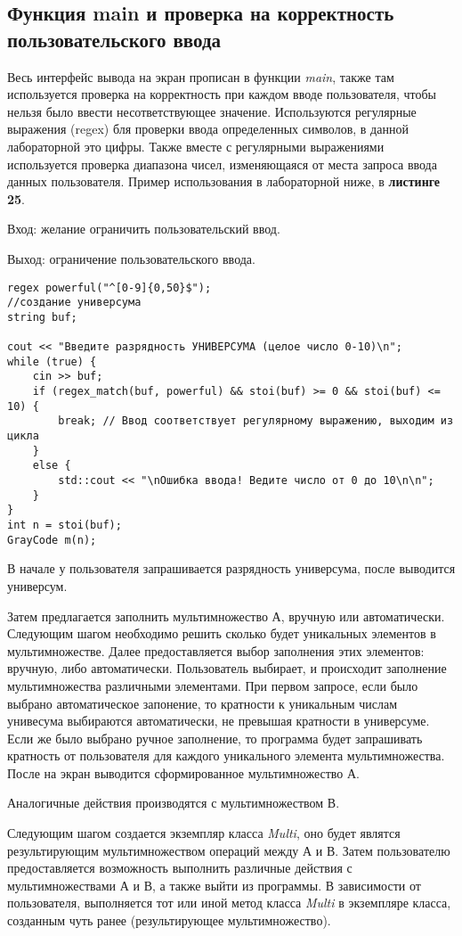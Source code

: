 \documentclass[10pt,a4paper,final]{article} %
\begin{document}
 
\newpage
\subsection{Функция main и проверка на корректность пользовательского ввода}
\par Весь интерфейс вывода на экран прописан в функции \textit{main}, также там используется проверка на корректность при каждом вводе пользователя, чтобы нельзя было ввести несответствующее значение. 
Используются регулярные выражения (regex) бля проверки ввода определенных символов, в данной лабораторной это цифры. Также вместе с регулярными выражениями используется проверка диапазона чисел, изменяющаяся от места запроса ввода данных пользователя. Пример использования в лабораторной ниже, в \textbf{листинге 25}.

\par Вход: желание ограничить пользовательский ввод.
\par Выход: ограничение пользовательского ввода.
\begin{lstlisting}[caption={Пример корректности пользовательского ввода}]
regex powerful("^[0-9]{0,50}$");
//создание универсума
string buf;

cout << "Введите разрядность УНИВЕРСУМА (целое число 0-10)\n";
while (true) {
	cin >> buf;
	if (regex_match(buf, powerful) && stoi(buf) >= 0 && stoi(buf) <= 10) {
		break; // Ввод соответствует регулярному выражению, выходим из цикла
	}
	else {
		std::cout << "\nОшибка ввода! Ведите число от 0 до 10\n\n";
	}
}
int n = stoi(buf);
GrayCode m(n);
\end{lstlisting}

\par В начале у пользователя запрашивается разрядность универсума, после выводится универсум. 
\par Затем предлагается заполнить мультимножество А, вручную или автоматически. Следующим шагом необходимо решить сколько будет уникальных элементов в мультимножестве. Далее предоставляется выбор заполнения этих элементов: вручную, либо автоматически. Пользователь выбирает, и происходит заполнение мультимножества различными элементами. При первом запросе, если было выбрано автоматическое запонение, то кратности к уникальным числам унивесума выбираются автоматически, не превышая кратности в универсуме. Если же было выбрано ручное заполнение, то программа будет запрашивать кратность от пользователя для каждого уникального элемента мультимножества. После на экран выводится сформированное мультимножество А.
\par Аналогичные действия производятся с мультимножеством В.
\par Следующим шагом создается экземпляр класса \textit{Multi}, оно будет являтся результирующим мультимножеством операций между А и В. Затем пользователю предоставляется возможность выполнить различные действия с мультимножествами А и В, а также выйти из программы. В зависимости от пользователя, выполняется тот или иной метод класса \textit{Multi} в экземпляре класса, созданным чуть ранее (результирующее мультимножество).
 
\end{document}
